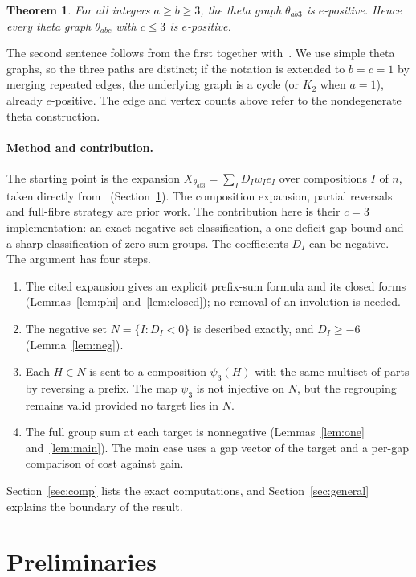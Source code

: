 \documentclass[11pt]{article}
\newtheorem{theorem}{Theorem}
\theoremstyle{remark}
\theoremstyle{definition}
\begin{document}
\begin{theorem}\label{thm:main}
For all integers $a\ge b\ge 3$, the theta graph $\theta_{ab3}$ is $e$-positive. Hence every theta graph $\theta_{abc}$ with $c\le 3$ is $e$-positive.
\end{theorem}

The second sentence follows from the first together with~\cite{Wang2024cyclechords,ChenHeWang2024}. We use simple theta graphs, so the three paths are distinct; if the notation is extended to $b=c=1$ by merging repeated edges, the underlying graph is a cycle (or $K_2$ when $a=1$), already $e$-positive. The edge and vertex counts above refer to the nondegenerate theta construction.

\paragraph{Method and contribution.} The starting point is the expansion $X_{\theta_{ab3}}=\sum_I D_Iw_Ie_I$ over compositions $I$ of $n$, taken directly from~\cite[Theorem~3.1]{ChenHeWang2024} (Section~\ref{sec:prelim}). The composition expansion, partial reversals and full-fibre strategy are prior work. The contribution here is their $c=3$ implementation: an exact negative-set classification, a one-deficit gap bound and a sharp classification of zero-sum groups. The coefficients $D_I$ can be negative. The argument has four steps.
\begin{enumerate}
\item The cited expansion gives an explicit prefix-sum formula and its closed forms (Lemmas~\ref{lem:phi} and~\ref{lem:closed}); no removal of an involution is needed.
\item The negative set $N=\{I: D_I<0\}$ is described exactly, and $D_I\ge -6$ (Lemma~\ref{lem:neg}).
\item Each $H\in N$ is sent to a composition $\psi_3(H)$ with the same multiset of parts by reversing a prefix. The map $\psi_3$ is not injective on $N$, but the regrouping remains valid provided no target lies in $N$.
\item The full group sum at each target is nonnegative (Lemmas~\ref{lem:one} and~\ref{lem:main}). The main case uses a gap vector of the target and a per-gap comparison of cost against gain.
\end{enumerate}
Section~\ref{sec:comp} lists the exact computations, and Section~\ref{sec:general} explains the boundary of the result.

\section{Preliminaries}\label{sec:prelim}
\end{document}
